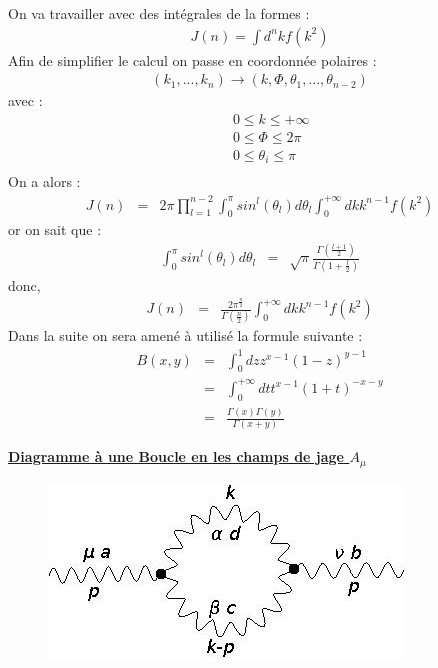 \documentclass[a4paper,11pt]{article}
\theoremstyle{plain}
\theoremstyle{definition}
\theoremstyle{remark}
\numberwithin{equation}{section}
\numberwithin{equation}{subsection}
\numberwithin{figure}{section}
\begin{document}
\noindent
On va travailler avec des intégrales de la formes : 
\begin{eqnarray}
 J(n) = \int d^{n}k f(k^2)
\end{eqnarray}
Afin de simplifier le calcul on passe en coordonnée polaires : 
\begin{eqnarray}
 \left( k_{1} , ... , k_{n} \right) \rightarrow \left( k, \Phi, \theta_{1}, ... , \theta_{n-2} \right)
\end{eqnarray}
avec :
\begin{eqnarray}
 && 0 \leq k \leq + \infty \\
 && 0 \leq \Phi \leq 2 \pi \\
 && 0 \leq \theta_{i} \leq \pi \\
\end{eqnarray}
On a alors :
\begin{eqnarray}
 J(n) &=& 2 \pi  \prod_{l=1}^{n-2} \int_{0}^{\pi} sin^{l}(\theta_{l}) d\theta_{l}  \int_{0}^{+\infty} dk k^{n-1} f(k^2)
\end{eqnarray}
or on sait que :
\begin{eqnarray}
 \int_{0}^{\pi} sin^{l}(\theta_{l}) d\theta_{l}   &=& \sqrt{\pi} \frac{\Gamma(\frac{l+1}{2})}{\Gamma(1+\frac{l}{2})}
\end{eqnarray}
donc,
\begin{eqnarray}
 J(n) &=& \frac{2 \pi ^{\frac{n}{2}}}{\Gamma(\frac{n}{2})} \int_{0}^{+\infty} dk k^{n-1} f(k^2)
\end{eqnarray}
Dans la suite on sera amené à utilisé la formule suivante :
\begin{eqnarray}
 B(x,y) &=& \int_{0}^{1} dz z^{x-1} (1-z)^{y-1} \\
            &=& \int_{0}^{+\infty}  dt t^{x-1} (1+t)^{-x-y} \\
            &=& \frac{\Gamma(x) \Gamma(y)}{\Gamma(x+y)}
\end{eqnarray}

\noindent
\underline{\textbf{Diagramme à une Boucle en les champs de jage $A_{\mu}$}}

\begin{figure}[H]
 \begin{center}
  \includegraphics[scale=0.4]{1_loop_2_vert_3A.jpg}
 \end{center}
\end{figure}
\end{document}
